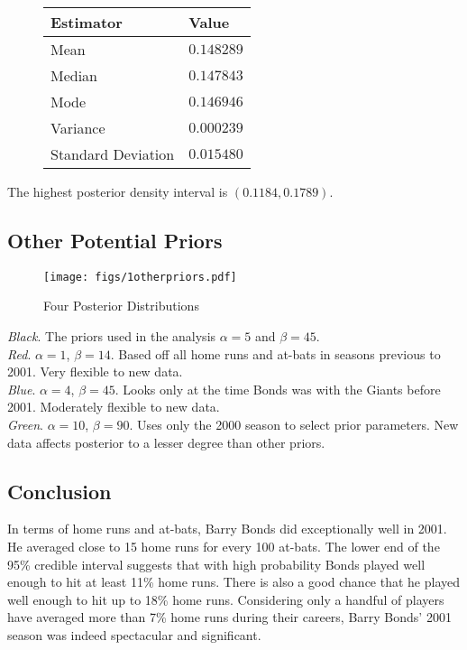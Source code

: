 \documentclass[12pt]{article}
\begin{document}
\begin{figure}[H]
\begin{center}
\begin{tabular}{l|r}
Estimator & \multicolumn{1}{l}{Value} \\ \hline \hline
Mean & $0.148289$ \\
Median & $0.147843$ \\
Mode & $0.146946$ \\
Variance & $0.000239$ \\
Standard Deviation & $0.015480$ \\
\end{tabular}
\end{center}
\end{figure}

\noindent The highest posterior density interval is $(0.1184, 0.1789)$.

\subsection{Other Potential Priors}


\begin{figure}[H]
\begin{center}
\texttt{[image: figs/1otherpriors.pdf]}
\caption{Four Posterior Distributions}
\end{center}
\end{figure}

\noindent \textit{Black}.  The priors used in the analysis $\alpha=5$ and $\beta=45$. \\ [-0.3cm]

\noindent \textit{Red}. $\alpha=1$, $\beta=14$.  Based off all home runs and at-bats in seasons previous to 2001.  Very flexible to new data. \\ [-0.3cm]

\noindent \textit{Blue}. $\alpha=4$, $\beta=45$.  Looks only at the time Bonds was with the Giants before 2001.  Moderately flexible to new data. \\ [-0.3cm]

\noindent \textit{Green}. $\alpha=10$, $\beta=90$.  Uses only the 2000 season to select prior parameters.  New data affects posterior to a lesser degree than other priors.

\subsection{Conclusion}

In terms of home runs and at-bats, Barry Bonds did exceptionally well in 2001.  He averaged close to 15 home runs for every 100 at-bats.  The lower end of the 95\% credible interval suggests that with high probability Bonds played well enough to hit at least 11\% home runs.  There is also a good chance that he played well enough to hit up to 18\% home runs.  Considering only a handful of players have averaged more than 7\% home runs during their careers, Barry Bonds' 2001 season was indeed spectacular and significant.
\end{document}
